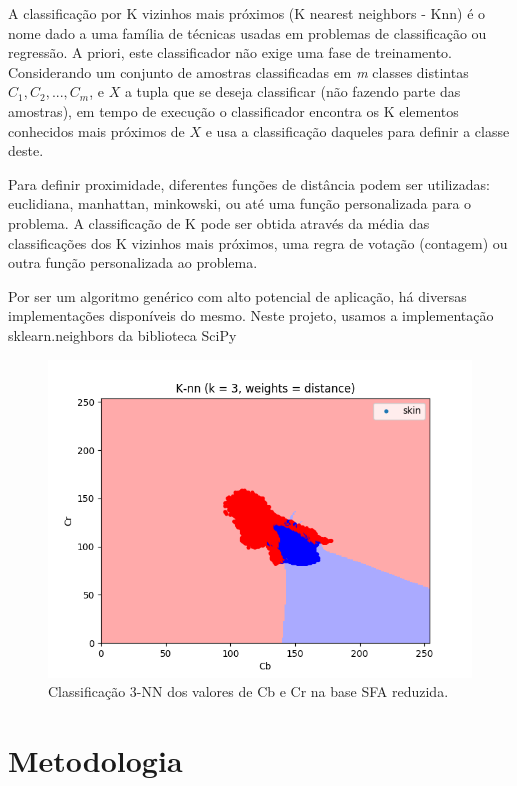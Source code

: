\documentclass[conference]{IEEEtran}
\begin{document}
A classificação por K vizinhos mais próximos (K nearest neighbors - Knn) é o nome dado a uma família de técnicas usadas em problemas de classificação ou regressão\cite{goodfellow}. A priori, este classificador não exige uma fase de treinamento. Considerando um conjunto de amostras classificadas em \textit{m} classes distintas \(C_1, C_2,...,C_m\), e \(X\) a tupla que se deseja classificar (não fazendo parte das amostras), em tempo de execução o classificador encontra os K elementos conhecidos mais próximos de \(X\) e usa a classificação daqueles para definir a classe deste. 

Para definir proximidade, diferentes funções de distância podem ser utilizadas: euclidiana, manhattan, minkowski, ou até uma função personalizada para o problema. A classificação de K pode ser obtida através da média das classificações dos K vizinhos mais próximos, uma regra de votação (contagem) ou outra função personalizada ao problema.

Por ser um algoritmo genérico com alto potencial de aplicação, há diversas implementações disponíveis do mesmo. Neste projeto, usamos a implementação sklearn.neighbors da biblioteca SciPy\cite{scipy}


\begin{figure}[ht!]
\begin{center}
\includegraphics[width=\columnwidth]{knn-3.png}
\caption{Classificação 3-NN dos valores de Cb e Cr na base SFA reduzida.}
\end{center}
\end{figure}


\section{Metodologia}\label{metodologia}
\end{document}
